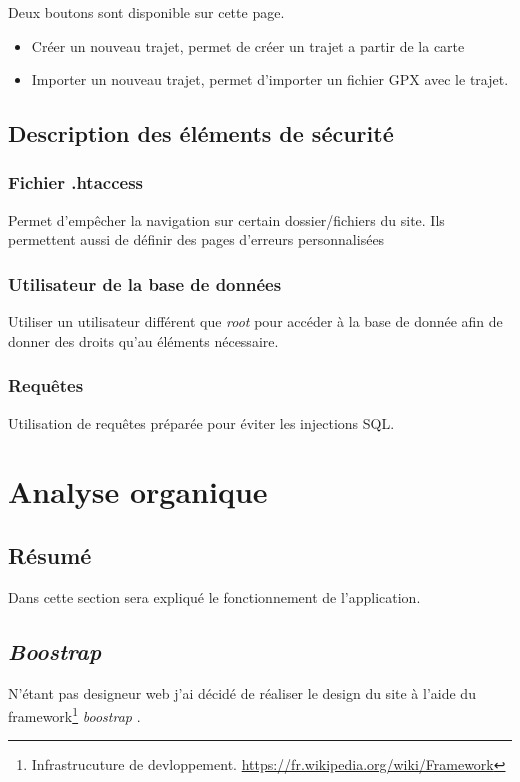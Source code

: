 \documentclass[a4paper]{article}
\newcommand{\bt}{\emph{boostrap }}
\begin{document}
Deux boutons sont disponible sur cette page.
\begin{itemize}
    \item Créer un nouveau trajet, permet de créer un trajet a partir de la carte
    \item Importer un nouveau trajet, permet d'importer un fichier GPX avec le trajet.
\end{itemize}

\subsection{Description des éléments de sécurité}
\subsubsection{Fichier .htaccess}
Permet d'empêcher la navigation sur certain dossier/fichiers du site. Ils permettent aussi de définir des pages d'erreurs personnalisées

\subsubsection{Utilisateur de la base de données}
Utiliser un utilisateur différent que \emph{root} pour accéder à la base de donnée afin de donner des droits qu'au éléments nécessaire.

\subsubsection{Requêtes}
Utilisation de requêtes préparée pour éviter les injections SQL.


\pagebreak








\pagebreak


\section{Analyse organique} 
\subsection{Résumé}
Dans cette section sera expliqué le fonctionnement de l'application.

\subsection{\emph{Boostrap}}
N'étant pas designeur web j'ai décidé de réaliser le design du site à l'aide du framework\footnote{Infrastrucuture de devloppement. \url{https://fr.wikipedia.org/wiki/Framework}} \bt.
\end{document}

